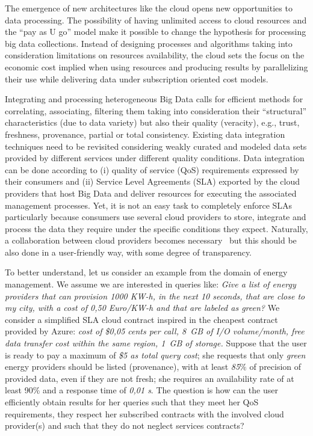 The emergence of new architectures like the cloud opens new opportunities to data processing. 
The possibility of having unlimited access to cloud resources and the ``pay as U go'' model make it possible to change the hypothesis for processing big  data collections.  Instead of designing processes and algorithms taking into consideration  limitations on resources availability, the cloud sets the focus on the economic cost implied when using resources and producing results by parallelizing their use while delivering data under subscription oriented cost models.
 
Integrating and processing heterogeneous Big Data calls for efficient methods for correlating, associating, filtering them taking into consideration their ``structural'' characteristics (due to data variety) but also their quality (veracity), e.g., trust, freshness, provenance, partial or total consistency. 
Existing data integration techniques need to be revisited considering weakly curated and modeled data sets provided by different services under different quality conditions. Data integration can be done according to  (i) quality of service (QoS) requirements expressed by their consumers and (ii) Service Level Agreements (SLA)  exported by the cloud providers that host  Big Data and deliver resources for executing the associated management processes. Yet, it is not an easy task to completely enforce SLAs particularly because consumers use several cloud providers to store, integrate and process the data they require under the specific conditions they expect.
Naturally, a collaboration between cloud providers becomes necessary~\cite{036} but this should be also done in a user-friendly way, with some degree of transparency. 

To better understand, let us consider an example from the domain of energy
management. We assume we are interested in queries like: \textit{Give a list
of energy providers that can provision 1000 KW-h, in the next 10 seconds, that are close to my city, with a cost of 0,50 Euro/KW-h and that are labeled as green?} We consider a simplified SLA cloud contract inspired in the cheapest contract provided by Azure: \textit{cost of \$0,05 cents per call,  8~GB of I/O volume/month, free data transfer cost within the same region,  1~GB of storage.} 
Suppose that the user is ready to pay a maximum of \textit{\$5 as total query cost}; she requests that only  \textit{green} energy providers should be  listed (provenance), with at least  \textit{85$\%$} of precision of provided data, even if they are not fresh; she requires an availability rate of at least 90$\%$ and a response time of  \textit{0,01 s}. 
  The question is how can the user efficiently obtain  results for her queries such that they meet her QoS requirements, they respect her subscribed contracts with the involved cloud provider(s) and such that they do not neglect services contracts? 

